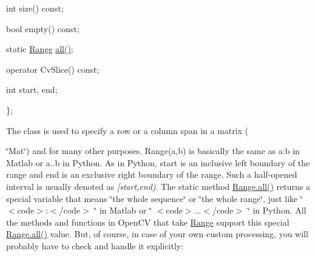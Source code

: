 {\ttfamily }

{\ttfamily }

{\ttfamily int size() const;}

{\ttfamily }

{\ttfamily }

{\ttfamily bool empty() const;}

{\ttfamily }

{\ttfamily }

{\ttfamily static \mbox{\hyperlink{classorg_1_1opencv_1_1core_1_1_range}{Range}} \mbox{\hyperlink{classorg_1_1opencv_1_1core_1_1_range_a2dd4a07a9715665aacee5c7cdf79a175}{all()}};}

{\ttfamily }

{\ttfamily }

{\ttfamily operator Cv\+Slice() const;}

{\ttfamily }

{\ttfamily }

{\ttfamily int start, end;}

{\ttfamily }

{\ttfamily }

{\ttfamily \};}

{\ttfamily }

{\ttfamily }

{\ttfamily The class is used to specify a row or a column span in a matrix (}

\char`\"{}\+Mat\char`\"{}) and for many other purposes. {\ttfamily Range(a,b)} is basically the same as {\ttfamily a\+:b} in Matlab or {\ttfamily a..b} in Python. As in Python, {\ttfamily start} is an inclusive left boundary of the range and {\ttfamily end} is an exclusive right boundary of the range. Such a half-\/opened interval is usually denoted as {\itshape \mbox{[}start,end)}. The static method {\ttfamily \mbox{\hyperlink{classorg_1_1opencv_1_1core_1_1_range_a2dd4a07a9715665aacee5c7cdf79a175}{Range.\+all()}}} returns a special variable that means \char`\"{}the whole sequence\char`\"{} or \char`\"{}the whole range\char`\"{}, just like \char`\"{} $<$code$>$\+:$<$/code$>$ \char`\"{} in Matlab or \char`\"{} $<$code$>$...$<$/code$>$ \char`\"{} in Python. All the methods and functions in Open\+CV that take {\ttfamily \mbox{\hyperlink{classorg_1_1opencv_1_1core_1_1_range}{Range}}} support this special {\ttfamily \mbox{\hyperlink{classorg_1_1opencv_1_1core_1_1_range_a2dd4a07a9715665aacee5c7cdf79a175}{Range.\+all()}}} value. But, of course, in case of your own custom processing, you will probably have to check and handle it explicitly\+: {\ttfamily }

